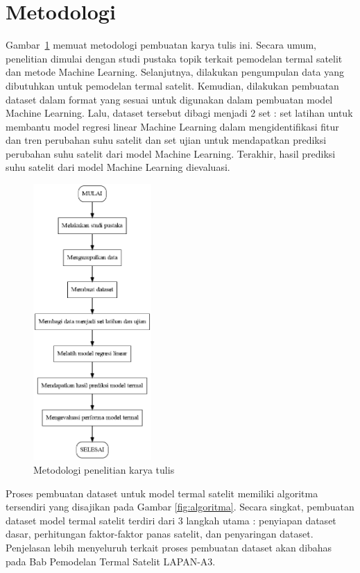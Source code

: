 \section{Metodologi}

Gambar~\ref{fig:metodologi} memuat metodologi pembuatan karya tulis ini. Secara umum,
penelitian dimulai dengan studi pustaka topik terkait pemodelan termal satelit
dan metode Machine Learning. Selanjutnya, dilakukan pengumpulan data yang
dibutuhkan untuk pemodelan termal satelit. Kemudian, dilakukan pembuatan
dataset dalam format yang sesuai untuk digunakan dalam pembuatan model Machine
Learning. Lalu, dataset tersebut dibagi menjadi 2 set : set latihan untuk
membantu model regresi linear Machine Learning dalam mengidentifikasi fitur dan
tren perubahan suhu satelit dan set ujian untuk mendapatkan prediksi perubahan
suhu satelit dari model Machine Learning. Terakhir, hasil prediksi suhu satelit
dari model Machine Learning dievaluasi.

\begin{figure}[H]
\setlength{}
\begin{center}
\includegraphics[width=0.4\textwidth]{fig/graph_metodologi.png}
\caption{Metodologi penelitian karya tulis}
\label{fig:metodologi}
\end{center}
\end{figure}

Proses pembuatan dataset untuk model termal satelit memiliki algoritma
tersendiri yang disajikan pada Gambar \ref{fig:algoritma}. Secara singkat,
pembuatan dataset model termal satelit terdiri dari 3 langkah utama : penyiapan
dataset dasar, perhitungan faktor-faktor panas satelit, dan penyaringan
dataset. Penjelasan lebih menyeluruh terkait proses pembuatan dataset akan
dibahas pada Bab Pemodelan Termal Satelit LAPAN-A3.

